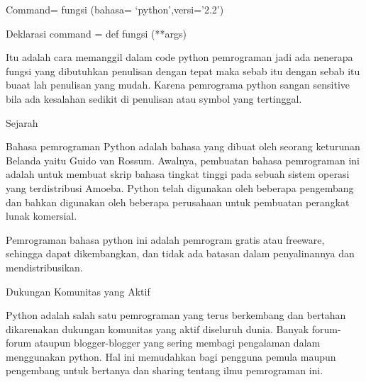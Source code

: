 \noindent 
{\fontsize{14pt}{14pt}\selectfont Command= fungsi (bahasa= ‘python’,versi=’2.2’) \\} \par
\noindent 
{\fontsize{14pt}{14pt}\selectfont Deklarasi command = def fungsi (**args) \\} \par
\vspace{14pt}
\noindent 
{\fontsize{14pt}{14pt}\selectfont Itu adalah cara memanggil dalam code python pemrograman jadi ada nenerapa fungsi yang dibutuhkan penulisan dengan tepat maka sebab itu dengan sebab itu buaat lah penulisan yang mudah. Karena pemrograma python sangan sensitive bila ada kesalahan sedikit di penulisan atau symbol yang tertinggal. \\} \par
\vspace{14pt}
\vspace{14pt}
\noindent 
{\fontsize{14pt}{14pt}\selectfont Sejarah \\} \par
\noindent 
{\fontsize{14pt}{14pt}\selectfont Bahasa pemrograman Python adalah bahasa yang dibuat oleh seorang keturunan Belanda yaitu Guido van Rossum. Awalnya, pembuatan bahasa pemrograman ini adalah untuk membuat skrip bahasa tingkat tinggi pada sebuah sistem operasi yang terdistribusi Amoeba. Python telah digunakan oleh beberapa pengembang dan bahkan digunakan oleh beberapa perusahaan untuk pembuatan perangkat lunak komersial. \\} \par
\noindent 
{\fontsize{14pt}{14pt}\selectfont Pemrograman bahasa python ini adalah pemrogram gratis atau freeware, sehingga dapat dikembangkan, dan tidak ada batasan dalam penyalinannya dan mendistribusikan. \\} \par
\vspace{14pt}
\noindent 
{\fontsize{14pt}{14pt}\selectfont Dukungan Komunitas yang Aktif \\} \par
\noindent 
{\fontsize{14pt}{14pt}\selectfont Python adalah salah satu pemrograman yang terus berkembang dan bertahan dikarenakan dukungan komunitas yang aktif diseluruh dunia. Banyak forum-forum ataupun blogger-blogger yang sering membagi pengalaman dalam menggunakan python. Hal ini memudahkan bagi pengguna pemula maupun pengembang untuk bertanya dan sharing tentang ilmu pemrograman ini. \\} \par
